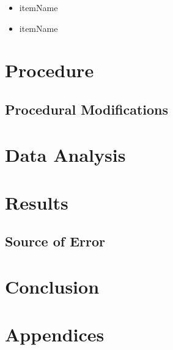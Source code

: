 \documentclass[a4paper]{article}
\begin{document}
\qq 

\begin{itemize}
\item itemName \\
\item itemName \\
\end{itemize}

\begin{figure}[H]
\centering
\label{Diagram}
\end{figure}

\section{Procedure}


\subsection{Procedural Modifications}
\qq 

\section{Data Analysis}


\section{Results}

\subsection{Source of Error}

\section{Conclusion}

\section{Appendices}
\end{document}
